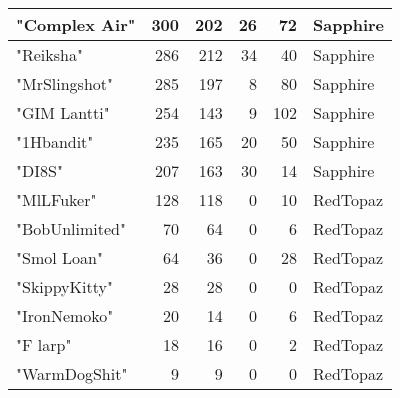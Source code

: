 \documentclass{article}
\begin{document}
\begin{table}[htbp]
\begin{tabular}{|l|r|r|r|r|l|}
"Complex Air" & 300 & 202 & 26 & 72 & Sapphire \\ \hline
"Reiksha" & 286 & 212 & 34 & 40 & Sapphire \\ \hline
"MrSlingshot" & 285 & 197 & 8 & 80 & Sapphire \\ \hline
"GIM Lantti" & 254 & 143 & 9 & 102 & Sapphire \\ \hline
"1Hbandit" & 235 & 165 & 20 & 50 & Sapphire \\ \hline
"DI8S" & 207 & 163 & 30 & 14 & Sapphire \\ \hline
"MlLFuker" & 128 & 118 & 0 & 10 & RedTopaz \\ \hline
"BobUnlimited" & 70 & 64 & 0 & 6 & RedTopaz \\ \hline
"Smol Loan" & 64 & 36 & 0 & 28 & RedTopaz \\ \hline
"SkippyKitty" & 28 & 28 & 0 & 0 & RedTopaz \\ \hline
"IronNemoko" & 20 & 14 & 0 & 6 & RedTopaz \\ \hline
"F larp" & 18 & 16 & 0 & 2 & RedTopaz \\ \hline
"WarmDogShit" & 9 & 9 & 0 & 0 & RedTopaz \\ \hline
\end{tabular}
\end{table}
\end{document}
